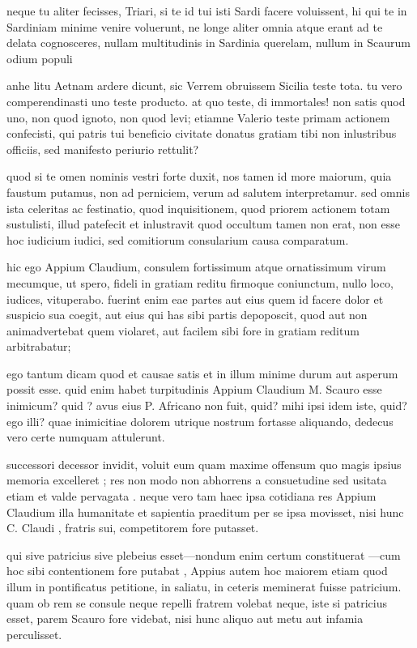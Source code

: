  neque tu aliter fecisses, Triari, si te id tui isti Sardi facere voluissent, hi qui te in Sardiniam minime venire voluerunt, ne longe aliter omnia atque erant ad te delata cognosceres, nullam multitudinis in Sardinia querelam, nullum in Scaurum odium populi

 anhe litu Aetnam ardere dicunt, sic Verrem obruissem Sicilia teste tota. tu vero comperendinasti uno teste producto. at quo teste, di immortales! non satis quod uno, non quod ignoto, non quod levi; etiamne Valerio teste primam actionem confecisti, qui patris tui beneficio civitate donatus gratiam tibi non inlustribus officiis, sed manifesto periurio rettulit?

 quod si te omen nominis vestri forte duxit, nos tamen id more maiorum, quia faustum putamus, non ad perniciem, verum ad salutem interpretamur. sed omnis ista celeritas ac festinatio, quod inquisitionem, quod priorem actionem totam sustulisti, illud patefecit et inlustravit quod occultum tamen non erat, non esse hoc iudicium iudici, sed comitiorum consularium causa comparatum.

 hic ego Appium Claudium, consulem fortissimum atque ornatissimum virum mecumque, ut spero, fideli in gratiam reditu firmoque coniunctum, nullo loco, iudices, vituperabo. fuerint enim eae partes aut eius quem id facere dolor et suspicio sua coegit, aut eius qui has sibi partis depoposcit, quod aut non animadvertebat quem violaret, aut facilem sibi fore in gratiam reditum arbitrabatur;

 ego tantum dicam quod et causae satis et in illum minime durum aut asperum possit esse. quid enim habet turpitudinis Appium Claudium M. Scauro esse inimicum? quid ? avus eius P. Africano non fuit, quid? mihi ipsi idem iste, quid? ego illi? quae inimicitiae dolorem utrique nostrum fortasse aliquando, dedecus vero certe numquam attulerunt.

 successori decessor invidit, voluit eum quam maxime offensum quo magis ipsius memoria excelleret ; res non modo non abhorrens a consuetudine sed usitata etiam et valde pervagata . neque vero tam haec ipsa cotidiana res Appium Claudium illa humanitate et sapientia praeditum per se ipsa movisset, nisi hunc C. Claudi , fratris sui, competitorem fore putasset.

 qui sive patricius sive plebeius esset—nondum enim certum constituerat —cum hoc sibi contentionem fore putabat , Appius autem hoc maiorem etiam quod illum in pontificatus petitione, in saliatu, in ceteris meminerat fuisse patricium. quam ob rem se consule neque repelli fratrem volebat neque, iste si patricius esset, parem Scauro fore videbat, nisi hunc aliquo aut metu aut infamia perculisset.

